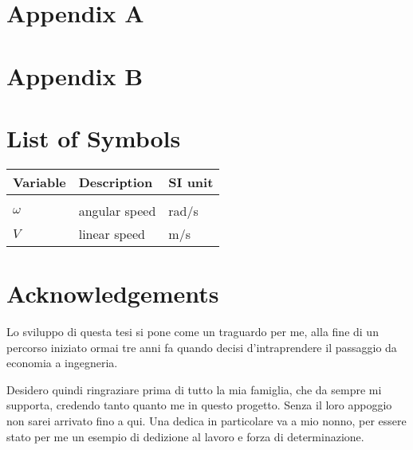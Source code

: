 \documentclass{Configuration_Files/PoliMi3i_thesis}
\begin{document}

\cleardoublepage
{} %
\appendix
\chapter{Appendix A}
\label{ch:appA}


\chapter{Appendix B}
\label{ch:appB}


\listoffigures

\listoftables

\chapter*{List of Symbols} %
\begin{table}[H]
    \centering
    \begin{tabular}{lll}
        \textbf{Variable} & \textbf{Description} & \textbf{SI unit} \\\hline\\[-9px]
        $\omega$ & angular speed & rad/s \\[2px]
        $V$ & linear speed & m/s \\[2px]
    \end{tabular}
\end{table}

\chapter*{Acknowledgements}
Lo sviluppo di questa tesi si pone come un traguardo per me, alla fine di un percorso
iniziato ormai tre anni fa quando decisi d'intraprendere il passaggio da economia a ingegneria.


Desidero quindi ringraziare prima di tutto la mia famiglia, che da sempre mi supporta,
credendo tanto quanto me in questo progetto. Senza il loro appoggio non sarei arrivato
fino a qui. Una dedica in particolare va a mio nonno, per essere stato per me un esempio
di dedizione al lavoro e forza di determinazione.
\end{document}
